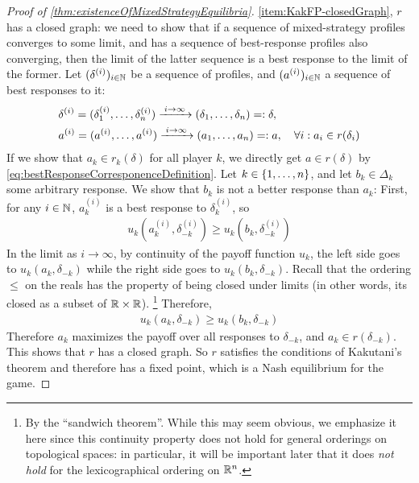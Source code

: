 \documentclass[a4paper]{scrreprt}
\begin{document}
\begin{proof}[Proof of \ref{thm:existenceOfMixedStrategyEquilibria}]
        \ref{item:KakFP-closedGraph}, $r$ has a closed graph: we need to show that if a sequence of mixed-strategy profiles converges to some limit, and has a sequence of best-response profiles also converging, then the limit of the latter sequence is a best response to the limit of the former. Let $(\delta^{(i)})_{i \in \mathbb{N}}$ be a sequence of profiles, and $(a^{(i)})_{i \in \mathbb{N}}$ a sequence of best responses to it:
        \begin{align*}
            &\delta^{(i)} = (\delta_1^{(i)}, \dots, \delta_n^{(i)}) \xrightarrow{\;i \to \infty\;} (\delta_1, \dots, \delta_n) =: \delta, \\
            &a^{(i)} = (a^{(i)}, \dots, a^{(i)}) \xrightarrow{\;i \to \infty\;} (a_1, \dots, a_n) =: a, \quad
            \forall i: a_i \in r(\delta_i)
        \end{align*}
        If we show that $a_k \in r_k(\delta)$ for all player $k$, we directly get $a \in r(\delta)$ by \eqref{eq:bestResponseCorresponenceDefinition}.
        Let $k \in \{1, \dots, n\}$, and let $b_k \in \Delta_k$ some arbitrary response. We show that $b_k$ is not a better response than $a_k$:
        First, for any $i \in \mathbb{N}$, $a^{(i)}_k$ is a best response to $\delta^{(i)}_k$, so
        \begin{gather*}
            u_k(a^{(i)}_k, \delta^{(i)}_{-k}) \geq u_k(b_k, \delta^{(i)}_{-k})
        \end{gather*}
        In the limit as $i \to \infty$, by continuity of the payoff function $u_k$, 
        the left side goes to $u_k(a_k, \delta_{-k})$ while the right side goes to $u_k(b_k, \delta_{-k})$.
        Recall that the ordering $\leq$ on the reals has the property of being closed under limits (in other words, its closed as a subset of $\mathbb{R} \times \mathbb{R}$).
        \footnote{By the “sandwich theorem”. While this may seem obvious, we emphasize it here since this continuity property does not hold for general orderings on topological spaces:
        in particular, it will be important later that it does \emph{not hold} for the lexicographical ordering on $\mathbb{R}^n$.}
        Therefore,
        \begin{gather*}
            u_k(a_k, \delta_{-k}) \geq u_k(b_k, \delta_{-k})
        \end{gather*}
        Therefore $a_k$ maximizes the payoff over all responses to $\delta_{-k}$, and $a_k \in r(\delta_{-k})$. This shows that $r$ has a closed graph.
        So $r$ satisfies the conditions of Kakutani's theorem and therefore has a fixed point, which is a Nash equilibrium for the game.
    \end{proof}
    
\end{document}

